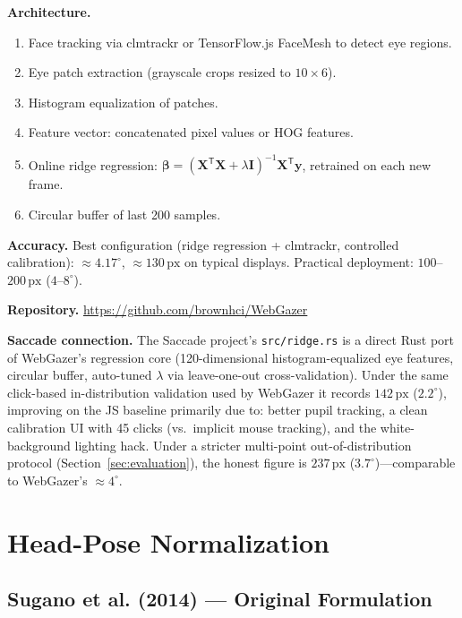\documentclass[11pt,a4paper]{article}
\begin{document}
\textbf{Architecture.}
\begin{enumerate}
  \item Face tracking via clmtrackr or TensorFlow.js FaceMesh to detect eye regions.
  \item Eye patch extraction (grayscale crops resized to $10\times6$).
  \item Histogram equalization of patches.
  \item Feature vector: concatenated pixel values or HOG features.
  \item Online ridge regression: $\boldsymbol{\beta} = (\mathbf{X}^\mathsf{T}\mathbf{X} + \lambda \mathbf{I})^{-1} \mathbf{X}^\mathsf{T} \mathbf{y}$, retrained on each new frame.
  \item Circular buffer of last 200 samples.
\end{enumerate}

\textbf{Accuracy.} Best configuration (ridge regression + clmtrackr, controlled calibration): ${\approx}4.17^\circ$, ${\approx}130\,\text{px}$ on typical displays. Practical deployment: $100$--$200\,\text{px}$ ($4$--$8^\circ$).

\textbf{Repository.} \url{https://github.com/brownhci/WebGazer}

\textbf{Saccade connection.} The Saccade project's \texttt{src/ridge.rs} is a direct Rust port of WebGazer's regression core (120-dimensional histogram-equalized eye features, circular buffer, auto-tuned $\lambda$ via leave-one-out cross-validation). Under the same click-based in-distribution validation used by WebGazer it records $142\,\text{px}$ ($2.2^\circ$), improving on the JS baseline primarily due to: better pupil tracking, a clean calibration UI with 45 clicks (vs.\ implicit mouse tracking), and the white-background lighting hack. Under a stricter multi-point out-of-distribution protocol (Section~\ref{sec:evaluation}), the honest figure is $237\,\text{px}$ ($3.7^\circ$)---comparable to WebGazer's ${\approx}4^\circ$.

\section{Head-Pose Normalization}
\label{sec:normalization}

\subsection{Sugano et al. (2014) --- Original Formulation}
\end{document}
